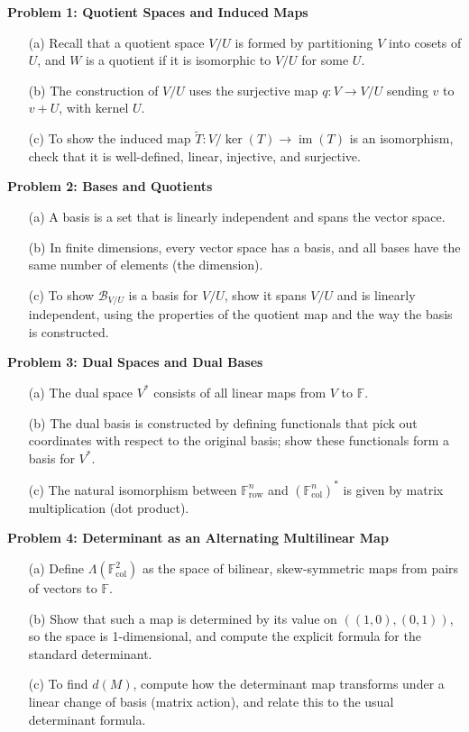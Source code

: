 \documentclass{article}
\begin{document}
\newpage
\begin{tcolorbox}[colback=yellow!10!white, colframe=orange!80!black, title=How to Approach Each Question (Summary)]
\textbf{Problem 1: Quotient Spaces and Induced Maps}
\begin{itemize}
   \item[(a)] Recall that a quotient space $V/U$ is formed by partitioning $V$ into cosets of $U$, and $W$ is a quotient if it is isomorphic to $V/U$ for some $U$.
   \item[(b)] The construction of $V/U$ uses the surjective map $q: V \to V/U$ sending $v$ to $v+U$, with kernel $U$.
   \item[(c)] To show the induced map $\tilde{T}: V/\ker(T) \to \operatorname{im}(T)$ is an isomorphism, check that it is well-defined, linear, injective, and surjective.
\end{itemize}

\textbf{Problem 2: Bases and Quotients}
\begin{itemize}
   \item[(a)] A basis is a set that is linearly independent and spans the vector space.
   \item[(b)] In finite dimensions, every vector space has a basis, and all bases have the same number of elements (the dimension).
   \item[(c)] To show $\mathscr{B}_{V/U}$ is a basis for $V/U$, show it spans $V/U$ and is linearly independent, using the properties of the quotient map and the way the basis is constructed.
\end{itemize}

\textbf{Problem 3: Dual Spaces and Dual Bases}
\begin{itemize}
   \item[(a)] The dual space $V^*$ consists of all linear maps from $V$ to $\mathbb{F}$.
   \item[(b)] The dual basis is constructed by defining functionals that pick out coordinates with respect to the original basis; show these functionals form a basis for $V^*$.
   \item[(c)] The natural isomorphism between $\mathbb{F}^n_{\text{row}}$ and $(\mathbb{F}^n_{\text{col}})^*$ is given by matrix multiplication (dot product).
\end{itemize}

\textbf{Problem 4: Determinant as an Alternating Multilinear Map}
\begin{itemize}
   \item[(a)] Define $\Lambda(\mathbb{F}^2_{\text{col}})$ as the space of bilinear, skew-symmetric maps from pairs of vectors to $\mathbb{F}$.
   \item[(b)] Show that such a map is determined by its value on $((1,0),(0,1))$, so the space is 1-dimensional, and compute the explicit formula for the standard determinant.
   \item[(c)] To find $d(M)$, compute how the determinant map transforms under a linear change of basis (matrix action), and relate this to the usual determinant formula.
\end{itemize}
\end{tcolorbox}
\end{document}
